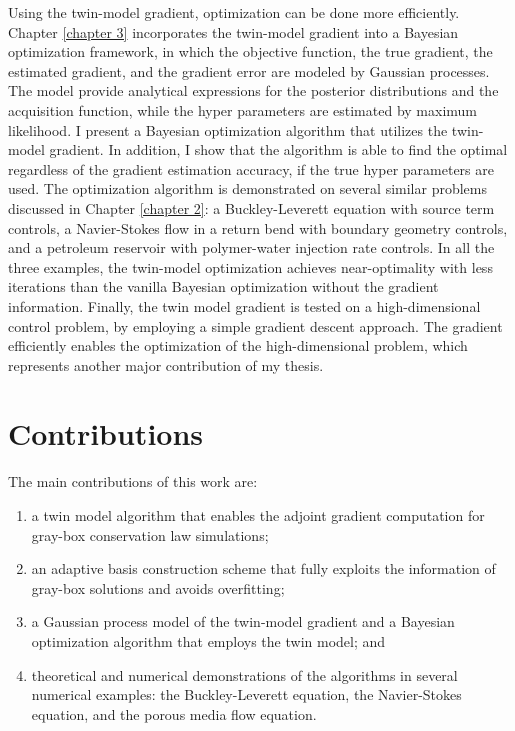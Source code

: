 Using the twin-model gradient, optimization can be done more efficiently.
Chapter \ref{chapter 3} incorporates the twin-model gradient into a Bayesian optimization framework,
in which the objective function, the true gradient,
the estimated gradient, and the gradient error are modeled by Gaussian processes.
The model provide analytical expressions for the 
posterior distributions and the acquisition function, while the 
hyper parameters are estimated by maximum likelihood.
I present a Bayesian optimization algorithm that utilizes the twin-model gradient.
In addition, I show that the algorithm is able to find the optimal regardless
of the gradient estimation accuracy, if the true hyper parameters are used.
The optimization algorithm is demonstrated on several similar problems discussed in
Chapter \ref{chapter 2}:
a Buckley-Leverett equation with source term controls,
a Navier-Stokes flow in a return bend with boundary geometry controls,
and a petroleum reservoir with polymer-water injection rate controls.
In all the three examples, the
twin-model optimization achieves
near-optimality with less iterations than the vanilla Bayesian optimization without
the gradient information. 
Finally, the twin model gradient is tested on a
high-dimensional control problem, by employing a simple gradient descent approach. 
The gradient efficiently enables the optimization of the high-dimensional problem,
which represents another major contribution of my thesis.\\


\section{Contributions}
The main contributions of this work are:
\begin{enumerate}
    \item a twin model algorithm that enables the adjoint gradient computation for gray-box
          conservation law simulations;
    \item an adaptive basis construction scheme that fully exploits the information of
          gray-box solutions and avoids overfitting;
    \item a Gaussian process model of the twin-model gradient
          and a Bayesian optimization algorithm that employs the twin model; and
    \item theoretical and numerical demonstrations of the algorithms 
          in several numerical examples: the Buckley-Leverett equation, the
          Navier-Stokes equation, and the porous media flow equation.
\end{enumerate}

